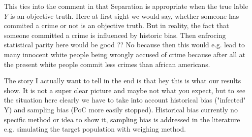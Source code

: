 This ties into the comment in \cite{castelnovo2022} that Separation is appropriate when
the true lable $Y$ is an objective truth. Here at first sight we would say, whether someone
has commited a crime or not is an objective truth. But in reality, the fact that someone committed
a crime is influenced by historic bias.
Then enfrocing statistical parity here would be good ?? No because then this would e.g. lead
to many innocent white people being wrongly accused of crime because after all at the present white people
commit less crimes than african americans.


The story I actually want to tell in the end is that hey this is what our results show. It is not a super clear picture and maybe not what you expect, but to see the situation here clearly we have to take into account historical bias ("infected" Y) and sampling bias (PoC more easily stopped). Historical bias currently no specific method or idea to show it, sampling bias is addressed in the literature e.g. simulating the target population with weighing method.